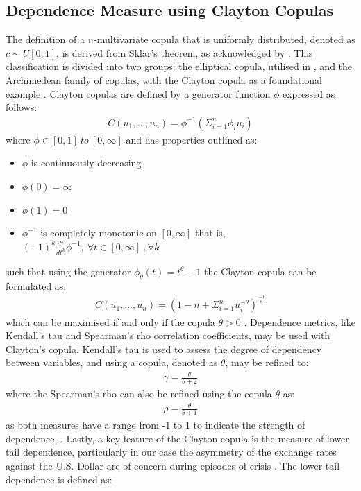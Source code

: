 \documentclass[a4paper]{article}
\theoremstyle{plain}
\theoremstyle{definition}
\theoremstyle{remark}
\begin{document}
\subsection{Dependence Measure using Clayton Copulas}\label{depen}
The definition of a $n$-multivariate copula that is uniformly distributed, denoted as $c \sim U[0,1]$, is derived from Sklar's theorem, as acknowledged by \cite{cuvelier2005clayton}. This classification is divided into two groups: the elliptical copula, utilised in \cite{molefe2020roads}, and the Archimedean family of copulas, with the Clayton copula as a foundational example \citep{LIU2020106808}.  Clayton copulas are defined by a generator function $\phi$ expressed as follows:
\begin{align}
    C(u_{1},...,u_{n}) = \phi^{-1}(\Sigma_{i=1}^{n} \phi_{i}u_{i})
\end{align}
where $\phi \in [0,1] \: to \:[0,\infty]$ \citep{wang2010copula} and has properties \citep{cuvelier2005clayton} outlined as:
\begin{itemize}
    \item $\phi$ is continuously decreasing
    \item $\phi(0) = \infty$
    \item $\phi(1) = 0$
    \item $\phi^{-1}$ is completely monotonic on $[0,\infty]$ that is, $(-1)^{k} \frac{d^{k}}{dt^{k}}\phi^{-1}, \: \forall t \in [0,\infty] \: ,\forall k$
\end{itemize}
such that using the generator $\phi_{\theta}(t) = t^{\theta} - 1$ the Clayton copula can be formulated as:
\begin{align}
     C(u_{1},...,u_{n}) = (1 - n + \Sigma_{i=1}^{n} u_{i}^{-\theta})^{\frac{-1}{\theta}}
\end{align}
which can be maximised if and only if the copula $\theta > 0$ \citep{cuvelier2005clayton}. Dependence metrics, like Kendall's tau and Spearman's rho correlation coefficients, may be used with Clayton's copula.  Kendall's tau is used to assess the degree of dependency between variables, and using a copula, denoted as $\theta$, may be refined to:
\begin{align}
    \gamma = \frac{\theta}{\theta + 2}
\end{align}
where the Spearman's rho can also be refined using the copula $\theta$ as:
\begin{align}
    \rho = \frac{\theta}{\theta + 1}
\end{align}
as both measures have a range from -1 to 1 to indicate the strength of dependence, \citep{nelsen2006archimedean}. Lastly, a key feature of the Clayton copula is the measure of lower tail dependence, particularly in our case the asymmetry of the exchange rates against the U.S. Dollar are of concern during episodes of crisis \citep{shamiri2011tail}. The lower tail dependence is defined as:
\end{document}
